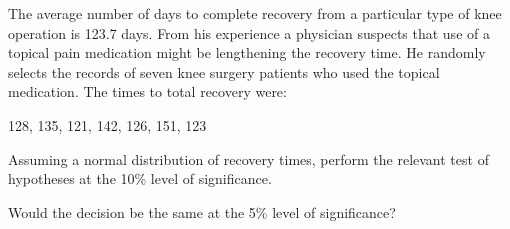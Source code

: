 
\begin{exercise}

The average number of days to complete recovery from a particular type
of knee operation is 123.7 days. From his experience a physician
suspects that use of a topical pain medication might be lengthening the
recovery time. He randomly selects the records of seven knee surgery
patients who used the topical medication. The times to total recovery
were:

128, 135, 121, 142, 126, 151, 123

Assuming a normal distribution of recovery times, perform the relevant
test of hypotheses at the 10\% level of significance.

Would the decision be the same at the 5\% level of significance?

\end{exercise}


